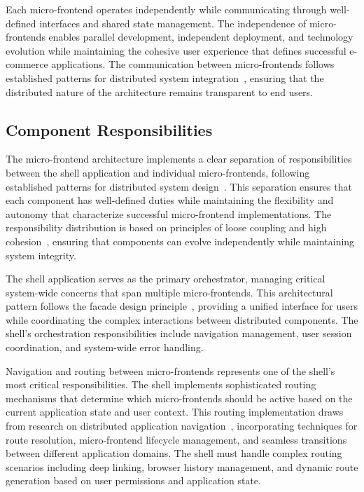 \documentclass[12pt,a4paper]{report}
\begin{document}
Each micro-frontend operates independently while communicating through well-defined interfaces and shared state management. The independence of micro-frontends enables parallel development, independent deployment, and technology evolution while maintaining the cohesive user experience that defines successful e-commerce applications. The communication between micro-frontends follows established patterns for distributed system integration~\cite{hohpe2003enterprise}, ensuring that the distributed nature of the architecture remains transparent to end users.

\subsection{Component Responsibilities}

The micro-frontend architecture implements a clear separation of responsibilities between the shell application and individual micro-frontends, following established patterns for distributed system design~\cite{newman2021monolith}. This separation ensures that each component has well-defined duties while maintaining the flexibility and autonomy that characterize successful micro-frontend implementations. The responsibility distribution is based on principles of loose coupling and high cohesion~\cite{martin2000principles}, ensuring that components can evolve independently while maintaining system integrity.

The shell application serves as the primary orchestrator, managing critical system-wide concerns that span multiple micro-frontends. This architectural pattern follows the facade design principle~\cite{gamma1994design}, providing a unified interface for users while coordinating the complex interactions between distributed components. The shell's orchestration responsibilities include navigation management, user session coordination, and system-wide error handling.

Navigation and routing between micro-frontends represents one of the shell's most critical responsibilities. The shell implements sophisticated routing mechanisms that determine which micro-frontends should be active based on the current application state and user context. This routing implementation draws from research on distributed application navigation~\cite{canter2020single-spa-orchestration}, incorporating techniques for route resolution, micro-frontend lifecycle management, and seamless transitions between different application domains. The shell must handle complex routing scenarios including deep linking, browser history management, and dynamic route generation based on user permissions and application state.
\end{document}
